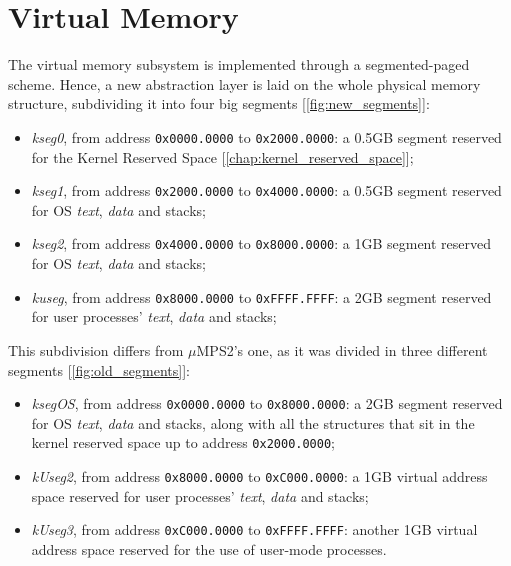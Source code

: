 \documentclass[12pt,a4paper,openright,twoside]{report}
\begin{document}
\section{Virtual Memory}
  The virtual memory subsystem is implemented through a segmented-paged scheme.
  Hence, a new abstraction layer is laid on the whole physical memory structure, subdividing it into four big segments [\autoref{fig:new_segments}]:
  \begin{itemize}  
	\item \textit{kseg0}, from address \texttt{0x0000.0000} to \texttt{0x2000.0000}: a 0.5GB segment reserved for the Kernel Reserved Space [\autoref{chap:kernel_reserved_space}];
	\item \textit{kseg1}, from address \texttt{0x2000.0000} to \texttt{0x4000.0000}: a 0.5GB segment reserved for OS \textit{text}, \textit{data} and stacks;
	\item \textit{kseg2}, from address \texttt{0x4000.0000} to \texttt{0x8000.0000}: a 1GB segment reserved for OS \textit{text}, \textit{data} and stacks;
	\item \textit{kuseg}, from address \texttt{0x8000.0000} to \texttt{0xFFFF.FFFF}: a 2GB segment reserved for user processes' \textit{text}, \textit{data} and stacks;
	\end{itemize}
	This subdivision differs from $\mu$MPS2's one, as it was divided in three different segments [\autoref{fig:old_segments}]:
	  \begin{itemize}  
	\item \textit{ksegOS}, from address \texttt{0x0000.0000} to \texttt{0x8000.0000}: a 2GB segment reserved for OS \textit{text}, \textit{data} and stacks, along with all the structures that sit in the kernel reserved space up to address \texttt{0x2000.0000};
	\item \textit{kUseg2}, from address \texttt{0x8000.0000} to \texttt{0xC000.0000}: a 1GB virtual address space reserved for user processes' \textit{text}, \textit{data} and stacks;
	\item \textit{kUseg3}, from address \texttt{0xC000.0000} to \texttt{0xFFFF.FFFF}: another 1GB virtual address space reserved for the use of user-mode processes.
	\end{itemize}
	
\end{document}

